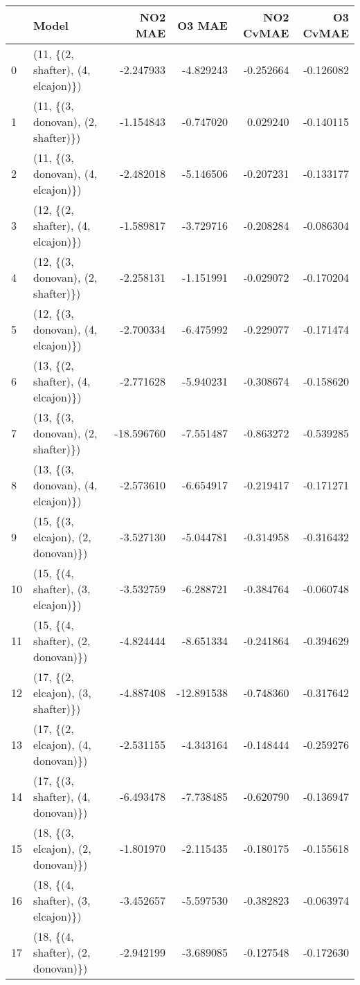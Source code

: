\begin{tabular}{llrrrr}
\toprule
{} &                               Model &    NO2 MAE &     O3 MAE &  NO2 CvMAE &  O3 CvMAE \\
\midrule
0  &  (11, \{(2, shafter), (4, elcajon)\}) &  -2.247933 &  -4.829243 &  -0.252664 & -0.126082 \\
1  &  (11, \{(3, donovan), (2, shafter)\}) &  -1.154843 &  -0.747020 &   0.029240 & -0.140115 \\
2  &  (11, \{(3, donovan), (4, elcajon)\}) &  -2.482018 &  -5.146506 &  -0.207231 & -0.133177 \\
3  &  (12, \{(2, shafter), (4, elcajon)\}) &  -1.589817 &  -3.729716 &  -0.208284 & -0.086304 \\
4  &  (12, \{(3, donovan), (2, shafter)\}) &  -2.258131 &  -1.151991 &  -0.029072 & -0.170204 \\
5  &  (12, \{(3, donovan), (4, elcajon)\}) &  -2.700334 &  -6.475992 &  -0.229077 & -0.171474 \\
6  &  (13, \{(2, shafter), (4, elcajon)\}) &  -2.771628 &  -5.940231 &  -0.308674 & -0.158620 \\
7  &  (13, \{(3, donovan), (2, shafter)\}) & -18.596760 &  -7.551487 &  -0.863272 & -0.539285 \\
8  &  (13, \{(3, donovan), (4, elcajon)\}) &  -2.573610 &  -6.654917 &  -0.219417 & -0.171271 \\
9  &  (15, \{(3, elcajon), (2, donovan)\}) &  -3.527130 &  -5.044781 &  -0.314958 & -0.316432 \\
10 &  (15, \{(4, shafter), (3, elcajon)\}) &  -3.532759 &  -6.288721 &  -0.384764 & -0.060748 \\
11 &  (15, \{(4, shafter), (2, donovan)\}) &  -4.824444 &  -8.651334 &  -0.241864 & -0.394629 \\
12 &  (17, \{(2, elcajon), (3, shafter)\}) &  -4.887408 & -12.891538 &  -0.748360 & -0.317642 \\
13 &  (17, \{(2, elcajon), (4, donovan)\}) &  -2.531155 &  -4.343164 &  -0.148444 & -0.259276 \\
14 &  (17, \{(3, shafter), (4, donovan)\}) &  -6.493478 &  -7.738485 &  -0.620790 & -0.136947 \\
15 &  (18, \{(3, elcajon), (2, donovan)\}) &  -1.801970 &  -2.115435 &  -0.180175 & -0.155618 \\
16 &  (18, \{(4, shafter), (3, elcajon)\}) &  -3.452657 &  -5.597530 &  -0.382823 & -0.063974 \\
17 &  (18, \{(4, shafter), (2, donovan)\}) &  -2.942199 &  -3.689085 &  -0.127548 & -0.172630 \\

\end{tabular}
